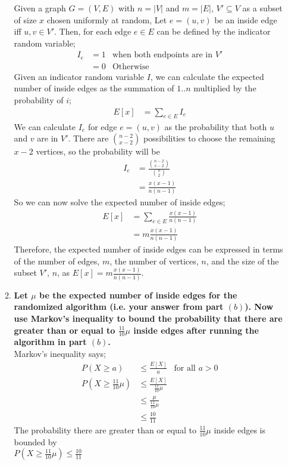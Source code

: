 \documentclass{article}
\begin{document}
\begin{enumerate}
\begin{enumerate}
Given a graph $G = (V,E)$ with $n=|V|$ and $m=|E|$, $V' \subseteq V$ as a subset of size $x$ chosen uniformly at random, Let $e = (u,v)$ be an inside edge iff $u,v \in V'$. Then, for each edge $e \in E$ can be defined by the indicator random variable; 
\begin{align*}
    I_e & = 1 & \text{when both endpoints are in } V' \\
    & = 0 & \text{Otherwise}
\end{align*}
Given an indicator random variable $I$, we can calculate the expected number of inside edges as the summation of $1..n$ multiplied by the probability of $i$; 
\begin{align*}
    E[x] & = \sum_{e \in E}I_e
\end{align*}
We can calculate $I_e$ for edge $e = (u,v)$ as the probability that both $u$ and $v$ are in $V'$. There are $n-2 \choose x-2$ possibilities to choose the remaining $x-2$ vertices, so the probability will be 
\begin{align*}
    I_e & = \frac{{n-2 \choose x-2 }}{{n \choose 2}} \\
    & = \frac{x(x-1)}{n(n-1)}
\end{align*}
So we can now solve the expected number of inside edges;
\begin{align*}
    E[x] & = \sum_{e \in E} \frac{x(x-1)}{n(n-1)} \\
    & = m \frac{x(x-1)}{n(n-1)}
\end{align*}
Therefore, the expected number of inside edges can be expressed in terms of the number of edges, $m$, the number of vertices, $n$, and the size of the subset $V'$, $n$, as $E[x] = m \frac{x(x-1)}{n(n-1)}$. \\








\item \textbf{Let $\mu$ be the expected number of inside edges for the randomized algorithm (i.e. your answer from part $(b)$). Now use Markov's inequality to bound the probability that there are greater than or equal to $\frac{11}{10} \mu$ inside edges after running the algorithm in part $(b)$.} \\

Markov's inequality says;
\begin{align*}
    P(X \geq a) & \leq \frac{E[X]}{a} & \text{for all } a > 0 \\
    P(X \geq \frac{11}{10} \mu ) & \leq \frac{E[X]}{\frac{11}{10} \mu} \\
    & \leq \frac{\mu}{\frac{11}{10} \mu} \\
    & \leq \frac{10}{11}
\end{align*}
The probability there are greater than or equal to $\frac{11}{10} \mu$ inside edges is bounded by \\
$P(X \geq \frac{11}{10} \mu) \leq \frac{10}{11}$












\end{enumerate}
\end{enumerate}
\end{document}
